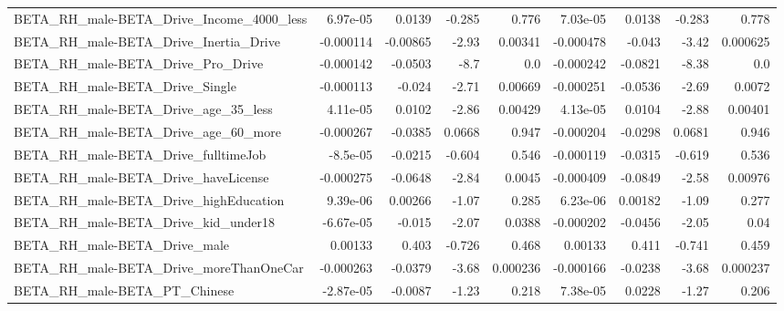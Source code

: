 \begin{tabular}{lrrrrrrrr}
BETA\_RH\_male-BETA\_Drive\_Income\_4000\_less           &    6.97e-05 &       0.0139 &   -0.285 &    0.776 &   7.03e-05 &      0.0138 &       -0.283 &         0.778 \\
BETA\_RH\_male-BETA\_Drive\_Inertia\_Drive              &   -0.000114 &     -0.00865 &    -2.93 &  0.00341 &  -0.000478 &      -0.043 &        -3.42 &      0.000625 \\
BETA\_RH\_male-BETA\_Drive\_Pro\_Drive                  &   -0.000142 &      -0.0503 &     -8.7 &      0.0 &  -0.000242 &     -0.0821 &        -8.38 &           0.0 \\
BETA\_RH\_male-BETA\_Drive\_Single                     &   -0.000113 &       -0.024 &    -2.71 &  0.00669 &  -0.000251 &     -0.0536 &        -2.69 &        0.0072 \\
BETA\_RH\_male-BETA\_Drive\_age\_35\_less                &    4.11e-05 &       0.0102 &    -2.86 &  0.00429 &   4.13e-05 &      0.0104 &        -2.88 &       0.00401 \\
BETA\_RH\_male-BETA\_Drive\_age\_60\_more                &   -0.000267 &      -0.0385 &   0.0668 &    0.947 &  -0.000204 &     -0.0298 &       0.0681 &         0.946 \\
BETA\_RH\_male-BETA\_Drive\_fulltimeJob                &    -8.5e-05 &      -0.0215 &   -0.604 &    0.546 &  -0.000119 &     -0.0315 &       -0.619 &         0.536 \\
BETA\_RH\_male-BETA\_Drive\_haveLicense                &   -0.000275 &      -0.0648 &    -2.84 &   0.0045 &  -0.000409 &     -0.0849 &        -2.58 &       0.00976 \\
BETA\_RH\_male-BETA\_Drive\_highEducation              &    9.39e-06 &      0.00266 &    -1.07 &    0.285 &   6.23e-06 &     0.00182 &        -1.09 &         0.277 \\
BETA\_RH\_male-BETA\_Drive\_kid\_under18                &   -6.67e-05 &       -0.015 &    -2.07 &   0.0388 &  -0.000202 &     -0.0456 &        -2.05 &          0.04 \\
BETA\_RH\_male-BETA\_Drive\_male                       &     0.00133 &        0.403 &   -0.726 &    0.468 &    0.00133 &       0.411 &       -0.741 &         0.459 \\
BETA\_RH\_male-BETA\_Drive\_moreThanOneCar             &   -0.000263 &      -0.0379 &    -3.68 & 0.000236 &  -0.000166 &     -0.0238 &        -3.68 &      0.000237 \\
BETA\_RH\_male-BETA\_PT\_Chinese                       &   -2.87e-05 &      -0.0087 &    -1.23 &    0.218 &   7.38e-05 &      0.0228 &        -1.27 &         0.206 \\

\end{tabular}
